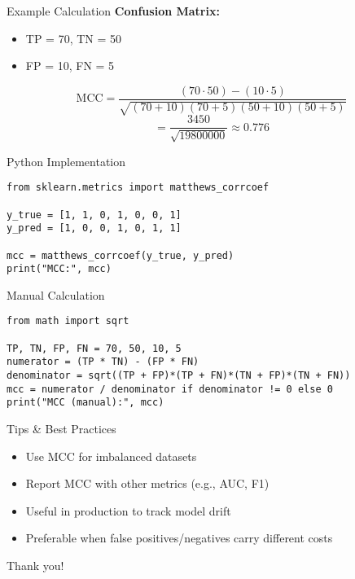 \documentclass{beamer}
\begin{document}
\begin{frame}{Example Calculation}
  \textbf{Confusion Matrix:}
  \begin{itemize}
    \item TP = 70, TN = 50
    \item FP = 10, FN = 5
  \end{itemize}
  \[
    \text{MCC} = \frac{(70 \cdot 50) - (10 \cdot 5)}{
    \sqrt{(70+10)(70+5)(50+10)(50+5)}}
  \]
  \[
    = \frac{3450}{\sqrt{19800000}} \approx 0.776
  \]
\end{frame}

\begin{frame}[fragile]{Python Implementation}
\begin{verbatim}
from sklearn.metrics import matthews_corrcoef

y_true = [1, 1, 0, 1, 0, 0, 1]
y_pred = [1, 0, 0, 1, 0, 1, 1]

mcc = matthews_corrcoef(y_true, y_pred)
print("MCC:", mcc)
\end{verbatim}
\end{frame}

\begin{frame}[fragile]{Manual Calculation}
    \small
\begin{verbatim}
from math import sqrt

TP, TN, FP, FN = 70, 50, 10, 5
numerator = (TP * TN) - (FP * FN)
denominator = sqrt((TP + FP)*(TP + FN)*(TN + FP)*(TN + FN))
mcc = numerator / denominator if denominator != 0 else 0
print("MCC (manual):", mcc)
\end{verbatim}
\end{frame}

\begin{frame}{Tips \& Best Practices}
  \begin{itemize}
    \item Use MCC for imbalanced datasets
    \item Report MCC with other metrics (e.g., AUC, F1)
    \item Useful in production to track model drift
    \item Preferable when false positives/negatives carry different costs
  \end{itemize}
\end{frame}

\begin{frame}[standout]
    Thank you!
\end{frame}
\end{document}
